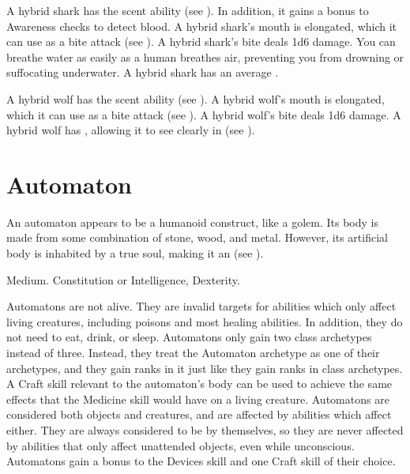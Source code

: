     \begin{raggeditemize}
       A hybrid shark has the scent ability (see ).
        In addition, it gains a  bonus to Awareness checks to detect blood.
       A hybrid shark's mouth is elongated, which it can use as a bite attack (see ).
        A hybrid shark's bite deals 1d6 damage.
       You can breathe water as easily as a human breathes air, preventing you from drowning or suffocating underwater.
       A hybrid shark has an average .
    \end{raggeditemize}


    \begin{raggeditemize}
       A hybrid wolf has the scent ability (see ).
       A hybrid wolf's mouth is elongated, which it can use as a bite attack (see ).
        A hybrid wolf's bite deals 1d6 damage.
       A hybrid wolf has , allowing it to see clearly in  (see ).
    \end{raggeditemize}

\section{Automaton}
  An automaton appears to be a humanoid construct, like a golem.
  Its body is made from some combination of stone, wood, and metal.
  However, its artificial body is inhabited by a true soul, making it an  (see ).

   Medium.
    Constitution or Intelligence,  Dexterity.
  \begin{raggeditemize}
     Automatons are not alive. They are invalid targets for abilities which only affect living creatures, including poisons and most healing abilities. In addition, they do not need to eat, drink, or sleep.
     Automatons only gain two class archetypes instead of three.
      Instead, they treat the Automaton archetype as one of their archetypes, and they gain ranks in it just like they gain ranks in class archetypes.
     A Craft skill relevant to the automaton's body can be used to achieve the same effects that the Medicine skill would have on a living creature.
     Automatons are considered both objects and creatures, and are affected by abilities which affect either.
      They are always considered to be  by themselves, so they are never affected by abilities that only affect unattended objects, even while unconscious.
     Automatons gain a  bonus to the Devices skill and one Craft skill of their choice.
  \end{raggeditemize}

